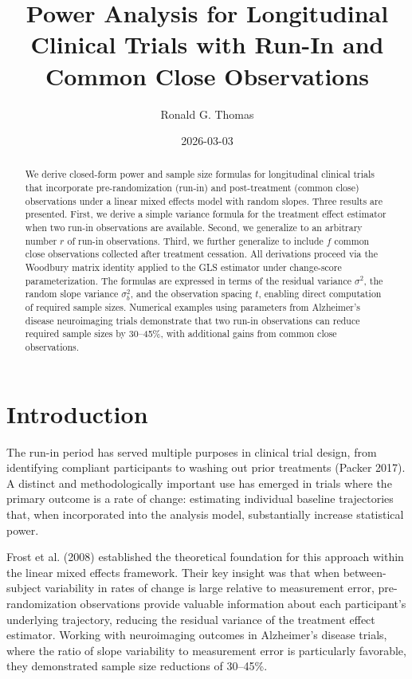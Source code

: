 \documentclass[
]{article}
\title{Power Analysis for Longitudinal Clinical Trials with Run-In and
Common Close Observations}
\author{Ronald G. Thomas}
\date{2026-03-03}
\begin{document}
\maketitle
\begin{abstract}
We derive closed-form power and sample size formulas for longitudinal
clinical trials that incorporate pre-randomization (run-in) and
post-treatment (common close) observations under a linear mixed effects
model with random slopes. Three results are presented. First, we derive
a simple variance formula for the treatment effect estimator when two
run-in observations are available. Second, we generalize to an arbitrary
number \(r\) of run-in observations. Third, we further generalize to
include \(f\) common close observations collected after treatment
cessation. All derivations proceed via the Woodbury matrix identity
applied to the GLS estimator under change-score parameterization. The
formulas are expressed in terms of the residual variance \(\sigma^2\),
the random slope variance \(\sigma_b^2\), and the observation spacing
\(t\), enabling direct computation of required sample sizes. Numerical
examples using parameters from Alzheimer's disease neuroimaging trials
demonstrate that two run-in observations can reduce required sample
sizes by 30--45\%, with additional gains from common close observations.
\end{abstract}

{
\setcounter{tocdepth}{2}
\tableofcontents
}
\section{Introduction}\label{introduction}

The run-in period has served multiple purposes in clinical trial design,
from identifying compliant participants to washing out prior treatments
(Packer 2017). A distinct and methodologically important use has emerged
in trials where the primary outcome is a rate of change: estimating
individual baseline trajectories that, when incorporated into the
analysis model, substantially increase statistical power.

Frost et al. (2008) established the theoretical foundation for this
approach within the linear mixed effects framework. Their key insight
was that when between-subject variability in rates of change is large
relative to measurement error, pre-randomization observations provide
valuable information about each participant's underlying trajectory,
reducing the residual variance of the treatment effect estimator.
Working with neuroimaging outcomes in Alzheimer's disease trials, where
the ratio of slope variability to measurement error is particularly
favorable, they demonstrated sample size reductions of 30--45\%.
\end{document}
